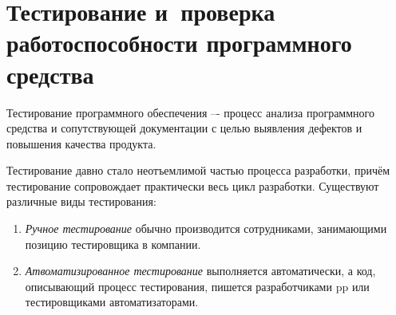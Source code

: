 \section{Тестирование и~проверка работоспособности программного средства}
\label{sec:testing}

Тестирование программного обеспечения –- процесс анализа программного средства и сопутствующей документации с целью выявления дефектов и повышения качества продукта\cite{kulikov_testing}.

Тестирование давно стало неотъемлимой частью процесса разработки, причём тестирование сопровождает практически весь цикл разработки. Существуют различные виды тестирования:
\begin{enumerate}
	\item \textit{Ручное тестирование} обычно производится сотрудниками, занимающими позицию тестировщика в компании.
	\item \textit{Атвоматизированное тестирование} выполняется автоматически, а код, описывающий процесс тестирования, пишется разработчиками \gls{pp} или тестировщиками автоматизаторами.
\end{enumerate}